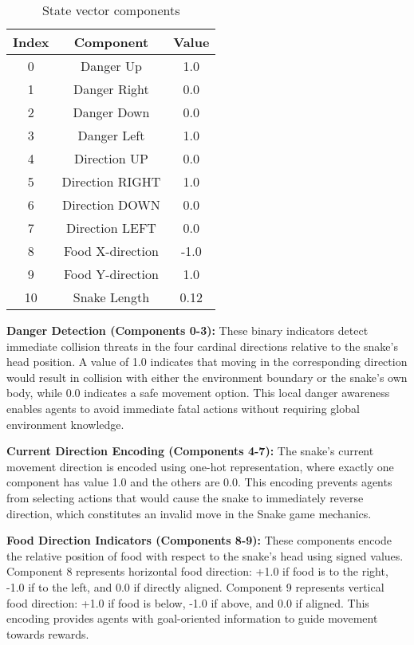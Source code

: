 \documentclass[a4paper,12pt]{article}
\begin{document}
\begin{table}[H]
         \begin{tabular}{|c|c|c|}
      \hline
      \textbf{Index} & \textbf{Component} & \textbf{Value} \\
      \hline
      0 & Danger Up & 1.0 \\
      1 & Danger Right & 0.0 \\
      2 & Danger Down & 0.0 \\
      3 & Danger Left & 1.0 \\
      4 & Direction UP & 0.0 \\
      5 & Direction RIGHT & 1.0 \\
      6 & Direction DOWN & 0.0 \\
      7 & Direction LEFT & 0.0 \\
      8 & Food X-direction & -1.0 \\
      9 & Food Y-direction & 1.0 \\
      10 & Snake Length & 0.12 \\
      \hline
      
      \end{tabular}
      \caption{State vector components}
      \label{tab:state_vector_components}
\end{table}


\textbf{Danger Detection (Components 0-3):} These binary indicators detect immediate collision threats in the four cardinal directions relative to the snake's head position. A value of 1.0 indicates that moving in the corresponding direction would result in collision with either the environment boundary or the snake's own body, while 0.0 indicates a safe movement option. This local danger awareness enables agents to avoid immediate fatal actions without requiring global environment knowledge.

\textbf{Current Direction Encoding (Components 4-7):} The snake's current movement direction is encoded using one-hot representation, where exactly one component has value 1.0 and the others are 0.0. This encoding prevents agents from selecting actions that would cause the snake to immediately reverse direction, which constitutes an invalid move in the Snake game mechanics.

\textbf{Food Direction Indicators (Components 8-9):} These components encode the relative position of food with respect to the snake's head using signed values. Component 8 represents horizontal food direction: +1.0 if food is to the right, -1.0 if to the left, and 0.0 if directly aligned. Component 9 represents vertical food direction: +1.0 if food is below, -1.0 if above, and 0.0 if aligned. This encoding provides agents with goal-oriented information to guide movement towards rewards.
\end{document}
